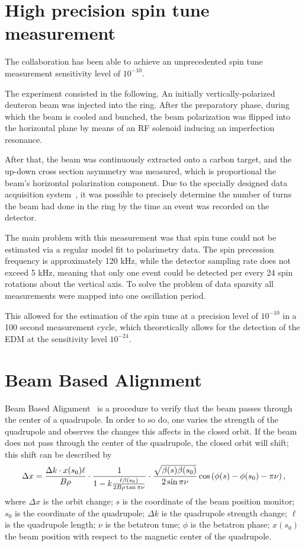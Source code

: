 

\section{High precision spin tune measurement}
The collaboration has been able to achieve an unprecedented spin tune measurement sensitivity level 
of $10^{-10}$. 

The experiment consisted in the following. An initially vertically-polarized deuteron beam was injected into the ring. After the preparatory phase, during which the beam is cooled and bunched, the beam polarization was flipped into the horizontal plane by means of an RF solenoid inducing an imperfection resonance.~\cite[p.~7]{COSY:SpinTuneMapping}

After that, the beam was continuously extracted onto a carbon target, and the up-down 
cross section asymmetry was measured, which is proportional the beam's horizontal polarization component. Due to the specially designed data acquisition system~\cite{COSY:DAQ}, it was possible to precisely determine the number of turns the beam had done in the ring by the time an event was recorded on the detector.

The main problem with this measurement was that spin tune could not be estimated via 
a regular model fit to polarimetry data.
The spin precession frequency is approximately 120 kHz, while the detector sampling rate does not 
exceed 5 kHz, meaning that only one event could be detected per every 24 spin rotations about the vertical axis.
To solve the problem of data sparsity all measurements were mapped into one oscillation period.~\cite{Eversmann:SpinTuneMeasurement}

This allowed for the estimation of the spin tune at a precision level of $10^{-10}$ in a 100 second measurement cycle, which theoretically allows for the detection of the EDM at the sensitivity level $10^{-24}$\ecm.

\section{Beam Based Alignment}
\newcommand{\Nbpm}{N_{\mathrm{BPM}}}
Beam Based Alignment~\cite{Wagner:BBA2018} is a procedure to verify 
that the beam passes through the center of a quadrupole.
In order to so do, one varies the strength of the quadrupole and observes the changes this affects in the 
closed orbit. If the beam does not pass through the center of the quadrupole, the closed orbit will shift;
this shift can be described by
\[
\Delta x = \frac{\Delta k\cdot x(s_0)\ell}{B\rho}\cdot \frac{1}{1 - k\frac{\ell\beta(s_0)}{2B\rho\tan\pi\nu}}\cdot \frac{\sqrt{\beta(s)\beta(s_0)}}{2\sin\pi\nu}\cos\bkt{\phi(s) - \phi(s_0) - \pi\nu},
\]
where $\Delta x$ is the orbit change; $s$ is the coordinate of the beam position monitor; $s_0$ is the coordinate of the quadrupole; $\Delta k$ is the quadrupole strength change; $\ell$ is the quadrupole length; $\nu$ is the betatron tune; $\phi$ is the betatron phase; $x(s_0)$ the beam position with respect to the magnetic center of the quadrupole.

